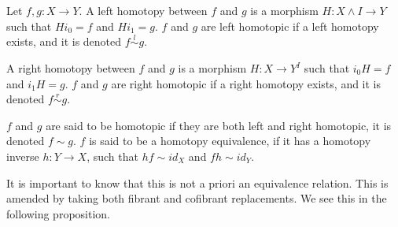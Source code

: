 \documentclass[../thesis.tex]{subfiles}
\begin{document}
            \begin{definition}
                Let $f,g: X\rightarrow Y$. A left homotopy between $f$ and $g$ is a morphism $H:X\wedge I \rightarrow Y$ such that $Hi_0 = f$ and $Hi_1 = g$. $f$ and $g$ are left homotopic if a left homotopy exists, and it is denoted $f \overset{l}{\sim} g$.

                \begin{center}
                \end{center}
                
                A right homotopy between $f$ and $g$ is a morphism $H: X \rightarrow Y^I$ such that $i_0H = f$ and $i_1H = g$. $f$ and $g$ are right homotopic if a right homotopy exists, and it is denoted $f \overset{r}{\sim} g$.

                \begin{center}
                \end{center}

                $f$ and $g$ are said to be homotopic if they are both left and right homotopic, it is denoted $f \sim g$. $f$ is said to be a homotopy equivalence, if it has a homotopy inverse $h: Y \rightarrow X$, such that $hf \sim id_X$ and $fh \sim id_Y$. 
            \end{definition}

            It is important to know that this is not a priori an equivalence relation. This is amended by taking both fibrant and cofibrant replacements. We see this in the following proposition.
\end{document}

